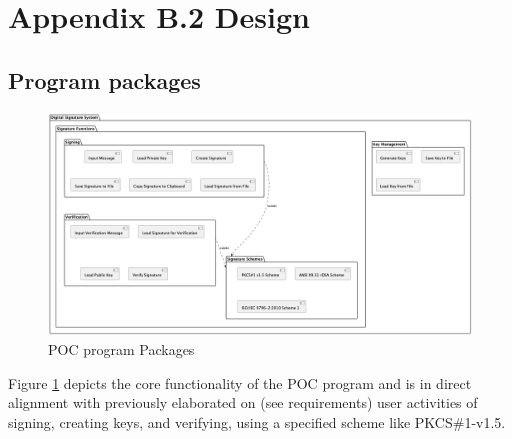 \documentclass[]{final_report}
\theoremstyle{definition}
\begin{document}
\section{Appendix B.2 Design}
\subsection{Program packages}
\begin{figure}[H]
    \centering
    \includegraphics[scale=0.31]{poc_pictures/package.png}
    \caption{POC program Packages}
    \label{fig:pack}
\end{figure}
Figure \ref{fig:pack} depicts the core functionality of the POC program and is in direct alignment with previously elaborated on (see requirements) user activities of signing, creating keys, and verifying, using a specified scheme like PKCS\#1-v1.5.
\end{document}
